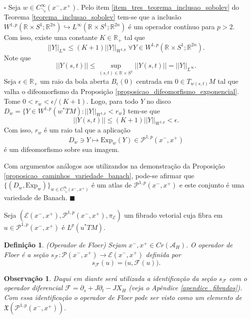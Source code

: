 \documentclass[12pt]{book}
\newtheorem{definicao}[teorema]{Definição}
\newtheorem{observacao}[teorema]{Observação}
\newenvironment{prova}[1]{$\square$ #1}{\hfill$\blacksquare$}
\newcommand{\bigparenteses}[1]{\Big( #1 \Big) }
\newcommand{\caminhosdecaimentoexponencial}[2]{C^{\infty}_{\searrow}(#1, #2)}
\newcommand{\caminhosdecaimentoexponencialpadrao}{\caminhosdecaimentoexponencial{x^{-}}{x^{+}}}
\newcommand{\caminhosexponenciaisconectantesabrev}{\mathcal{P}(x^{-},x^{+})}
\newcommand{\caminhosexponenciaisconectantes}[2]{\mathcal{P}^{1,p}(#1, #2)}
\newcommand{\caminhosexponenciaisconectantespadrao}{\caminhosexponenciaisconectantes{x^{-}}{x^{+}}}
\newcommand{\campohamiltonianoabrev}{X_{H}}
\newcommand{\campossuaves}[1]{\mathfrak{X}(#1)}
\newcommand{\circulo}{S^{1}}
\newcommand{\espacoLp}[1]{L^{p}(#1)}
\newcommand{\espacoLpGeral}[2]{L^{#1}(#2)}
\newcommand{\espacosobolev}[1]{W^{1,p}(#1)}
\newcommand{\espacosobolevcontradominio}[2]{W^{1,p}(#1;#2)}
\newcommand{\espacotangenteponto}[2]{T_{#1}#2}
\newcommand{\Exp}{\text{Exp}}
\newcommand{\fibradocaminhosexponenciais}{\mathcal{E}(x^{-}, x^{+})}
\newcommand{\funcionalH}{\mathcal{A}_{H}}
\newcommand{\operadorFloer}{\mathcal{F}}
\newcommand{\operadorFloerParametro}[1]{\mathcal{F}(#1)}
\newcommand{\norma}[1]{||#1||}
\newcommand{\normaWp}[1]{||#1||_{W^{1,p}}}
\newcommand{\pontoscriticos}[1]{\textit{Cr}(#1)}
\newcommand{\pullbackfibradotangente}[2]{#1^{*}T#2}
\newcommand{\pullbackfibradotangenteM}[1]{\pullbackfibradotangente{#1}{M}}
\newcommand{\retacartesianocirculo}{\real{} \times \circulo}
\newcommand{\real}[1]{\mathbb{R}^{#1}}
\newcommand{\reta}{\real{}}
\begin{document}
	\begin{prova}
		Seja $w \in \caminhosdecaimentoexponencialpadrao$. Pelo item \ref{item_tres_teorema_inclusao_sobolev} do Teorema \ref{teorema_inclusao_sobolev} tem-se que a inclusão $\espacosobolevcontradominio{\retacartesianocirculo}{\real{2n}} \hookrightarrow \espacoLpGeral{\infty}{\retacartesianocirculo;\real{2n}}$ é um operador contínuo para $p>2$. Com isso, existe uma constante $K\in \reta_{+}$ tal que 
		$$
		\norma{Y}_{L^{\infty}}\leq (K+1)\normaWp{Y}\;\forall Y\in \espacosobolevcontradominio{\retacartesianocirculo}{\real{2n}}.
		$$
		Note que 
		$$
		\norma{Y(s,t)}\leq \sup_{(s,t)\in \retacartesianocirculo}\norma{Y(s,t)} = \norma{Y}_{L^{\infty}}.
		$$
		Seja $\epsilon\in \reta_{+}$ um raio da bola aberta $B_{\epsilon}(0)$ centrada em $0\in \espacotangenteponto{w(s,t)}{M}$ tal que valha o difeomorfismo da Proposição \ref{proposicao_difeomorfismo_exponencial}. Tome  $0<r_{w}< \epsilon/(K+1)$. Logo, para todo $Y$ no disco $D_{w}=\{Y \in \espacosobolev{\pullbackfibradotangenteM{w}}: \normaWp{Y}<r_{w} \}$ tem-se que
		$$
		\norma{Y(s,t)} \leq (K+1)\normaWp{Y} < \epsilon.
		$$
		Com isso, $r_{w}$ é um raio tal que a aplicação 
		$$
		D_{w}\ni Y\mapsto \Exp_{w}(Y) \in \caminhosexponenciaisconectantespadrao
		$$ 
		é um difeomorfismo sobre sua imagem. 
		
		Com argumentos análogos aos utilizandos na demonstração da Proposição \ref{proposicao_caminhos_variedade_banach}, pode-se afirmar que $\{(D_{w}, \Exp_{w})\}_{w\in \caminhosdecaimentoexponencialpadrao} $ é um atlas de $\caminhosexponenciaisconectantespadrao$ e este conjunto é uma variedade de Banach.
	\end{prova}
	
	Seja $(\fibradocaminhosexponenciais, \caminhosexponenciaisconectantespadrao, \pi_{\mathcal{E}})$ um fibrado vetorial cuja fibra em $u \in \caminhosexponenciaisconectantespadrao$ é $\espacoLp{\pullbackfibradotangenteM{u}}$.
	
	\begin{definicao}\label{definicao_operador_floer}
		(Operador de Floer) Sejam $x^{-}, x^{+}\in \pontoscriticos{\funcionalH}$. O operador de Floer é a seção $s_{\operadorFloer}: \caminhosexponenciaisconectantesabrev \to \fibradocaminhosexponenciais$ definida por
		$$
		s_{\operadorFloer}(u)= \bigparenteses{u,\operadorFloerParametro{u}}.
		$$
	\end{definicao}
	
	\begin{observacao}
		Daqui em diante será utilizada a identificação da seção $s_{\operadorFloer}$ com o operador diferencial $\operadorFloer=\partial_{s}+J\partial_{t}-J\campohamiltonianoabrev$ (veja o Apêndice \ref{apendice_fibrados}). Com essa identificação o operador de Floer pode ser visto como um elemento de $\campossuaves{\caminhosexponenciaisconectantespadrao}$.
	\end{observacao}
	
\end{document}
